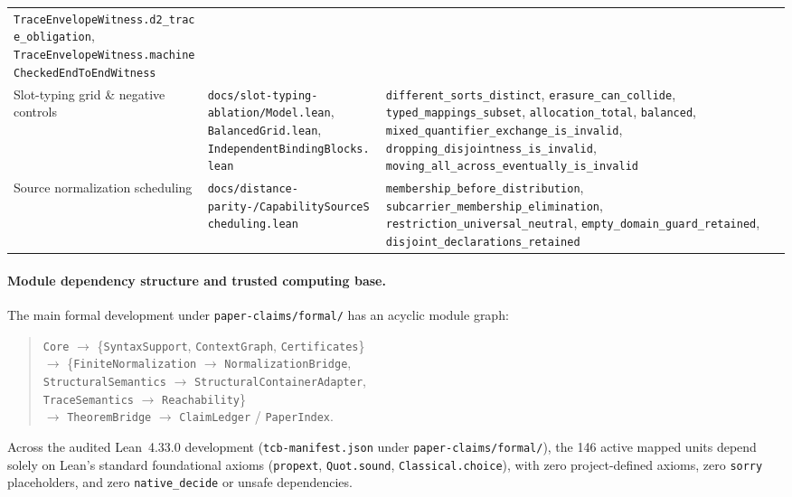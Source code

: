 \begin{table}[ht]
\begin{tabular}{@{}%
>{\raggedright\arraybackslash}p{2.95cm}%
>{\raggedright\arraybackslash}p{3.05cm}%
>{\raggedright\arraybackslash}p{5.75cm}@{}}
\texttt{TraceEnvelopeWitness.\allowbreak d2\_\allowbreak trace\_\allowbreak obligation},
\texttt{TraceEnvelopeWitness.\allowbreak machineChecked\allowbreak EndToEndWitness}\\[3pt]
Slot-typing grid \& negative controls &
\texttt{docs/slot-typing-\allowbreak ablation/\allowbreak Model.lean}, \texttt{BalancedGrid.lean}, \texttt{Independent\allowbreak BindingBlocks.lean} &
\texttt{different\_\allowbreak sorts\_\allowbreak distinct}, \texttt{erasure\_\allowbreak can\_\allowbreak collide},
\texttt{typed\_\allowbreak mappings\_\allowbreak subset}, \texttt{allocation\_\allowbreak total}, \texttt{balanced},
\texttt{mixed\_\allowbreak quantifier\_\allowbreak exchange\_\allowbreak is\_\allowbreak invalid},
\texttt{dropping\_\allowbreak disjointness\_\allowbreak is\_\allowbreak invalid},
\texttt{moving\_\allowbreak all\_\allowbreak across\_\allowbreak eventually\_\allowbreak is\_\allowbreak invalid}\\[3pt]
Source normalization scheduling &
\texttt{docs/distance-parity-\allowbreak 20261107/\allowbreak CapabilitySource\allowbreak Scheduling.lean} &
\texttt{membership\_\allowbreak before\_\allowbreak distribution},
\texttt{subcarrier\_\allowbreak membership\_\allowbreak elimination},
\texttt{restriction\_\allowbreak universal\_\allowbreak neutral},
\texttt{empty\_\allowbreak domain\_\allowbreak guard\_\allowbreak retained},
\texttt{disjoint\_\allowbreak declarations\_\allowbreak retained}\\
\bottomrule
\end{tabular}
\end{table}

\paragraph{Module dependency structure and trusted computing base.}
The main formal development under \texttt{paper-claims/formal/} has an acyclic
module graph:
\begin{quote}\small
\texttt{Core} $\to$ \{\texttt{SyntaxSupport}, \texttt{ContextGraph},
\texttt{Certificates}\}\\
$\to$ \{\texttt{FiniteNormalization} $\to$ \texttt{NormalizationBridge},\\
\hspace*{1.2em}\texttt{StructuralSemantics} $\to$ \texttt{StructuralContainerAdapter},\\
\hspace*{1.2em}\texttt{TraceSemantics} $\to$ \texttt{Reachability}\}\\
$\to$ \texttt{TheoremBridge} $\to$ \texttt{ClaimLedger} / \texttt{PaperIndex}.
\end{quote}
Across the audited Lean~4.33.0 development (\texttt{tcb-manifest.json}
under \texttt{paper-claims/formal/}),
the 146 active mapped units depend solely on Lean's standard foundational
axioms (\texttt{propext}, \texttt{Quot.sound}, \texttt{Classical.choice}),
with zero project-defined axioms, zero \texttt{sorry} placeholders, and zero
\texttt{native\_decide} or unsafe dependencies.

